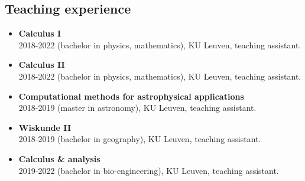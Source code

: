 \subsection*{Teaching experience}
\begin{itemize}
  \item[] \textbf{Calculus I} \hfill \\
  2018-2022 (bachelor in physics, mathematics), KU Leuven, teaching assistant.

  \item[] \textbf{Calculus II} \hfill \\
  2018-2022 (bachelor in physics, mathematics), KU Leuven, teaching assistant.

  \item[] \textbf{Computational methods for astrophysical applications} \hfill \\
  2018-2019 (master in astronomy), KU Leuven, teaching assistant.

  \item[] \textbf{Wiskunde II} \hfill \\
  2018-2019 (bachelor in geography), KU Leuven, teaching assistant.

  \item[] \textbf{Calculus \& analysis} \hfill \\
  2019-2022 (bachelor in bio-engineering), KU Leuven, teaching assistant.
\end{itemize}



